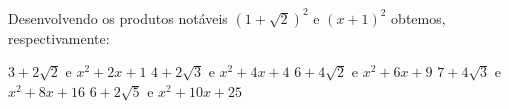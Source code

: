 Desenvolvendo os produtos notáveis $(1+\sqrt{2})^2$ e $(x+1)^2$ obtemos, respectivamente:

$3+2\sqrt{2}$ e $x^2+2x+1$
$4+2\sqrt{3}$ e $x^2+4x+4$
$6+4\sqrt{2}$ e $x^2+6x+9$
$7+4\sqrt{3}$ e $x^2+8x+16$
$6+2\sqrt{5}$ e $x^2+10x+25$


